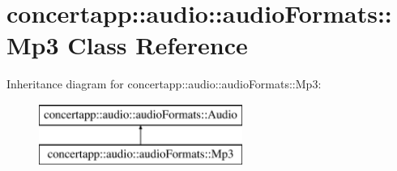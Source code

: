 \hypertarget{classconcertapp_1_1audio_1_1audio_formats_1_1_mp3}{
\section{concertapp::audio::audioFormats::Mp3 Class Reference}
\label{classconcertapp_1_1audio_1_1audio_formats_1_1_mp3}
}
Inheritance diagram for concertapp::audio::audioFormats::Mp3:\begin{figure}[H]
\begin{center}
\leavevmode
\includegraphics[height=2.000000cm]{classconcertapp_1_1audio_1_1audio_formats_1_1_mp3}
\end{center}
\end{figure}

